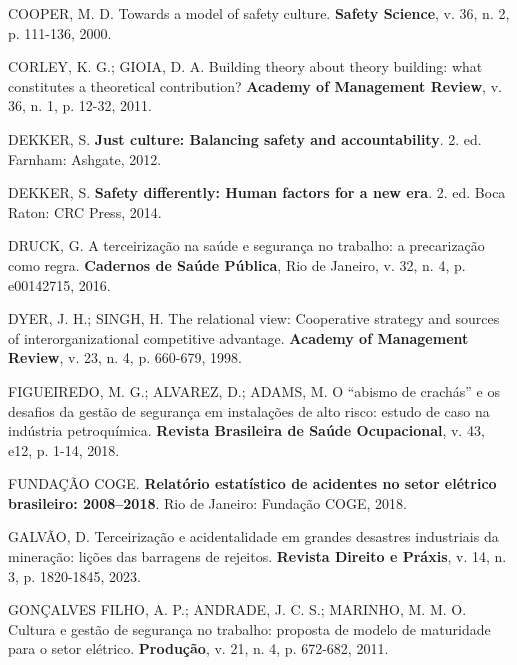 \documentclass[12pt,a4paper]{article}
\begin{document}
\vspace{0.25cm}
\noindent COOPER, M. D. Towards a model of safety culture. \textbf{Safety Science}, v. 36, n. 2, p. 111-136, 2000.

\vspace{0.25cm}
\noindent CORLEY, K. G.; GIOIA, D. A. Building theory about theory building: what constitutes a theoretical contribution? \textbf{Academy of Management Review}, v. 36, n. 1, p. 12-32, 2011.

\vspace{0.25cm}
\noindent DEKKER, S. \textbf{Just culture: Balancing safety and accountability}. 2. ed. Farnham: Ashgate, 2012.

\vspace{0.25cm}
\noindent DEKKER, S. \textbf{Safety differently: Human factors for a new era}. 2. ed. Boca Raton: CRC Press, 2014.

\vspace{0.25cm}
\noindent DRUCK, G. A terceirização na saúde e segurança no trabalho: a precarização como regra. \textbf{Cadernos de Saúde Pública}, Rio de Janeiro, v. 32, n. 4, p. e00142715, 2016.

\vspace{0.25cm}
\noindent DYER, J. H.; SINGH, H. The relational view: Cooperative strategy and sources of interorganizational competitive advantage. \textbf{Academy of Management Review}, v. 23, n. 4, p. 660-679, 1998.

\vspace{0.25cm}
\noindent FIGUEIREDO, M. G.; ALVAREZ, D.; ADAMS, M. O ``abismo de crachás'' e os desafios da gestão de segurança em instalações de alto risco: estudo de caso na indústria petroquímica. \textbf{Revista Brasileira de Saúde Ocupacional}, v. 43, e12, p. 1-14, 2018.

\vspace{0.25cm}
\noindent FUNDAÇÃO COGE. \textbf{Relatório estatístico de acidentes no setor elétrico brasileiro: 2008--2018}. Rio de Janeiro: Fundação COGE, 2018.

\vspace{0.25cm}
\noindent GALVÃO, D. Terceirização e acidentalidade em grandes desastres industriais da mineração: lições das barragens de rejeitos. \textbf{Revista Direito e Práxis}, v. 14, n. 3, p. 1820-1845, 2023.

\vspace{0.25cm}
\noindent GONÇALVES FILHO, A. P.; ANDRADE, J. C. S.; MARINHO, M. M. O. Cultura e gestão de segurança no trabalho: proposta de modelo de maturidade para o setor elétrico. \textbf{Produção}, v. 21, n. 4, p. 672-682, 2011.
\end{document}
